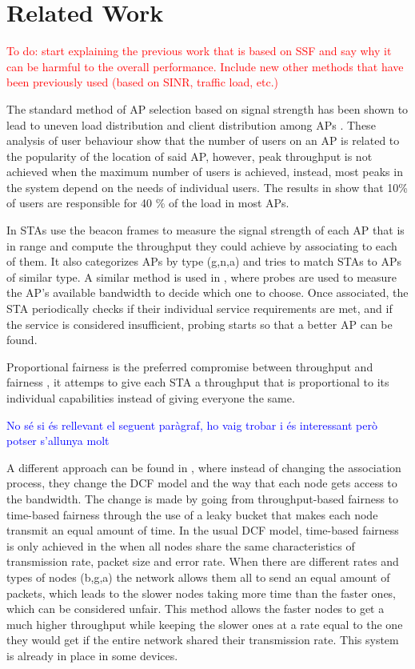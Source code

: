 \documentclass{ article}
\begin{document}
\section{Related Work}
\label{section:related_work}
	\textcolor{red}{To do: start explaining the previous work that is based on SSF and say why it can be harmful to the overall performance. Include new other methods that have been previously used (based on SINR, traffic load, etc.)}
	
	The standard method of AP selection based on signal strength has been shown to lead to uneven load distribution and client distribution among APs \cite{anand2002, balazinska2003}. These analysis of user behaviour show that the number of users on an AP is related to the popularity of the location of said AP, however, peak throughput is not achieved when the maximum number of users is achieved, instead, most peaks in the system depend on the needs of individual users. The results in \cite{balazinska2003} show that 10\% of users are responsible for 40 \% of the load in most APs. 
	
	In \cite{gong2012} STAs use the beacon frames to measure the signal strength of each AP that is in range and compute the throughput they could achieve by associating to each of them. It also categorizes APs by type (g,n,a) and tries to match STAs to APs of similar type. A similar method is used in \cite{sun2004}, where probes are used to measure the AP's available bandwidth to decide which one to choose. Once associated, the STA periodically checks if their individual service requirements are met, and if the service is considered insufficient, probing starts so that a better AP can be found.
	
	Proportional fairness is the preferred compromise between throughput and fairness \cite{Li2014} \cite{amer2016}, it attemps to give each STA a throughput that is proportional to its individual capabilities instead of giving everyone the same. 
	
		\textcolor{blue}{No sé si és rellevant el seguent paràgraf, ho vaig trobar i és interessant però potser s'allunya molt}
		
	A different approach can be found in \cite{tan2004}, where instead of changing the association process, they change the DCF model and the way that each node gets access to the bandwidth. The change is made by going from throughput-based fairness to time-based fairness through the use of a leaky bucket that makes each node transmit an equal amount of time. In the usual DCF model, time-based fairness is only achieved in the  when all nodes share the same characteristics of transmission rate, packet size and error rate. When there are different rates and types of nodes (b,g,a) the network allows them all to send an equal amount of packets, which leads to the slower nodes taking more time than the faster ones, which can be considered unfair. This method allows the faster nodes to get a much higher throughput while keeping the slower ones at a rate equal to the one they would get if the entire network shared their transmission rate. This system is already in place in some devices\cite{aruba2010}.
	
\end{document}
